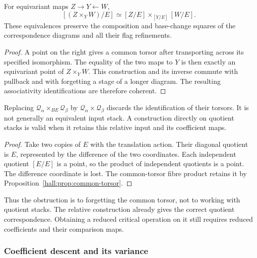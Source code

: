 \begin{proposition}
\label{prop:quotient-after-correspondence-preserves-composition}
\label{prop:quotient-after-correspondence-preserves-base-change}
For equivariant maps $Z\to Y\leftarrow W$,
\[
 [(Z\times_Y W)/E]
 \simeq[Z/E]\times_{[Y/E]}[W/E].
\]
These equivalences preserve the composition and base-change
squares of the correspondence diagrams and all their flag
refinements.
\end{proposition}

\begin{proof}
A point on the right gives a common torsor after transporting
across its specified isomorphism. The equality of the two maps
to $Y$ is then exactly an equivariant point of $Z\times_Y W$.
This construction and its inverse commute with pullback and with
forgetting a stage of a longer diagram. The resulting
associativity identifications are therefore coherent.
\end{proof}

\begin{proposition}
\label{prop:quotient-after-correspondence-excludes-quotient-first}
Replacing $\mathcal Q_\alpha\times_{BE}\mathcal Q_\beta$ by
$\mathcal Q_\alpha\times\mathcal Q_\beta$ discards the
identification of their torsors. It is not generally an equivalent
input stack. A construction directly on quotient stacks is valid
when it retains this relative input and its coefficient maps.
\end{proposition}

\begin{proof}
Take two copies of $E$ with the translation action. Their diagonal
quotient is $E$, represented by the difference of the two
coordinates. Each independent quotient $[E/E]$ is a point, so
the product of independent quotients is a point. The difference
coordinate is lost. The common-torsor fibre product retains it
by Proposition~\ref{hall:prop:common-torsor}.
\end{proof}

Thus the obstruction is to forgetting the common torsor, not to
working with quotient stacks. The relative construction already
gives the correct quotient correspondence. Obtaining a reduced
critical operation on it still requires reduced coefficients and
their comparison maps.

\subsubsection*{Coefficient descent and its variance}

